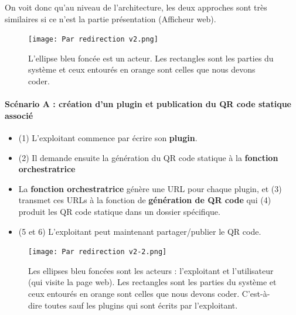 \documentclass[a4paper,12pt]{article}
\begin{document}
\noindent On voit donc qu'au niveau de l'architecture, les deux approches sont très similaires si ce n'est la partie présentation (Afficheur web).

\begin{figure}[H]
\begin{center}
  \texttt{[image: Par redirection v2.png]}
  \caption{L'ellipse bleu foncée est un acteur. Les rectangles sont les parties du système et ceux entourés en orange sont celles que nous devons coder.}
\end{center}
\end{figure}

\paragraph{Scénario A : création d'un plugin et publication du QR code statique associé}
\begin{itemize}
 \item (1) L'exploitant commence par écrire son \textbf{plugin}.
 \item (2) Il demande ensuite la génération du QR code statique à la \textbf{fonction orchestratrice}
 \item La \textbf{fonction orchestratrice} génère une URL pour chaque plugin, et (3) transmet ces URLs à la fonction de \textbf{génération de QR code} qui (4) produit les QR code statique dans un dossier spécifique.
 \item (5 et 6) L'exploitant peut maintenant partager/publier le QR code.
\end{itemize}

\begin{figure}[H]
\begin{center}
  \texttt{[image: Par redirection v2-2.png]}
  \caption{Les ellipses bleu foncées sont les acteurs : l'exploitant et l'utilisateur (qui visite la page web). Les rectangles sont les parties du système et ceux entourés en orange sont celles que nous devons coder. C'est-à-dire toutes sauf les plugins qui sont écrits par l'exploitant.}
\end{center}
\end{figure}
\end{document}
